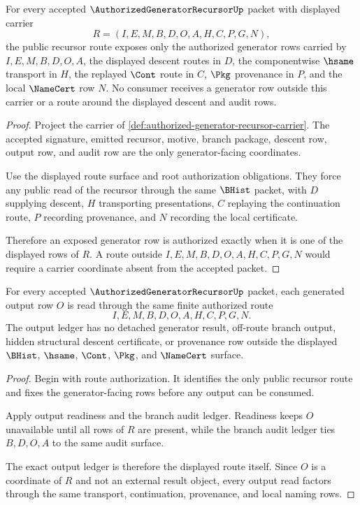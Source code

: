 \begin{theorem}
\label{thm:authorized-generator-recursor-route-authorization}
For every accepted $\AuthorizedGeneratorRecursorUp$ packet with displayed carrier
$$
R=(I,E,M,B,D,O,A,H,C,P,G,N),
$$
the public recursor route exposes only the authorized generator rows carried by $I,E,M,B,D,O,A$, the displayed descent routes in $D$, the componentwise $\hsame$ transport in $H$, the replayed $\Cont$ route in $C$, $\Pkg$ provenance in $P$, and the local $\NameCert$ row $N$. No consumer receives a generator row outside this carrier or a route around the displayed descent and audit rows.
\end{theorem}
\begin{proof}
Project the carrier of \autoref{def:authorized-generator-recursor-carrier}. The accepted signature, emitted recursor, motive, branch package, descent row, output row, and audit row are the only generator-facing coordinates.

Use the displayed route surface and root authorization obligations. They force any public read of the recursor through the same $\BHist$ packet, with $D$ supplying descent, $H$ transporting presentations, $C$ replaying the continuation route, $P$ recording provenance, and $N$ recording the local certificate.

Therefore an exposed generator row is authorized exactly when it is one of the displayed rows of $R$. A route outside $I,E,M,B,D,O,A,H,C,P,G,N$ would require a carrier coordinate absent from the accepted packet.
\end{proof}

\begin{theorem}
\label{thm:authorized-generator-recursor-output-ledger-exactness}
For every accepted $\AuthorizedGeneratorRecursorUp$ packet, each generated output row $O$ is read through the same finite authorized route
$$
I,E,M,B,D,O,A,H,C,P,G,N.
$$
The output ledger has no detached generator result, off-route branch output, hidden structural descent certificate, or provenance row outside the displayed $\BHist$, $\hsame$, $\Cont$, $\Pkg$, and $\NameCert$ surface.
\end{theorem}
\begin{proof}
Begin with route authorization. It identifies the only public recursor route and fixes the generator-facing rows before any output can be consumed.

Apply output readiness and the branch audit ledger. Readiness keeps $O$ unavailable until all rows of $R$ are present, while the branch audit ledger ties $B,D,O,A$ to the same audit surface.

The exact output ledger is therefore the displayed route itself. Since $O$ is a coordinate of $R$ and not an external result object, every output read factors through the same transport, continuation, provenance, and local naming rows.
\end{proof}

